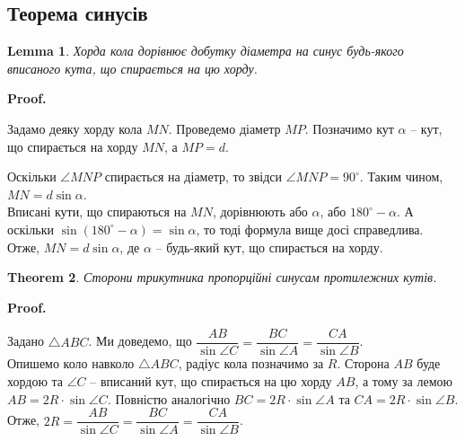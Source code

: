 \documentclass[a4paper, 10pt]{article}
\makeatletter
\theoremstyle{theoremdd}
\newtheorem{theorem}{Theorem}[subsection]
\theoremstyle{theoremdd}
\theoremstyle{theoremdd}
\theoremstyle{theoremdd}
\theoremstyle{theoremdd}
\theoremstyle{theoremdd}
\theoremstyle{theoremdd}
\theoremstyle{theoremdd}
\newtheorem{lemma}[theorem]{Lemma}
\theoremstyle{theoremdd}
\renewenvironment{proof}[1][Proof.\\]{\par
\pushQED{\hfill \qed}%
\normalfont \topsep6\p@\@plus6\p@\relax
\trivlist
\item\relax
{\bfseries
#1\@addpunct{.}}\hspace\labelsep\ignorespaces
}{%
\popQED\endtrivlist\@endpefalse
}
\makeatother
\begin{document}
\subsection{Теорема синусів}
\begin{lemma}
Хорда кола дорівнює добутку діаметра на синус будь-якого вписаного кута, що спирається на цю хорду.
\end{lemma}

\begin{proof}
Задамо деяку хорду кола $MN$. Проведемо діаметр $MP$. Позначимо кут $\alpha$ -- кут, що спирається на хорду $MN$, а $MP = d$.
\begin{figure}[H]
\centering
{}
\end{figure}
Оскільки $\angle MNP$ спирається на діаметр, то звідси $\angle MNP = 90^\circ$. Таким чином, $MN = d \sin \alpha$.\\
Вписані кути, що спираються на $MN$, дорівнюють або $\alpha$, або $180^\circ - \alpha$. А оскільки $\sin (180^\circ - \alpha) = \sin \alpha$, то тоді формула вище досі справедлива.\\
Отже, $MN = d \sin \alpha$, де $\alpha$ -- будь-який кут, що спирається на хорду.
\end{proof}

\begin{theorem}
Сторони трикутника пропорційні синусам протилежних кутів.
\end{theorem}

\begin{proof}
Задано $\triangle ABC$. Ми доведемо, що $\dfrac{AB}{\sin \angle C} = \dfrac{BC}{\sin \angle A} = \dfrac{CA}{\sin \angle B}$.\\
Опишемо коло навколо $\triangle ABC$, радіус кола позначимо за $R$. Сторона $AB$ буде хордою та $\angle C$ -- вписаний кут, що спирається на цю хорду $AB$, а тому за лемою $AB = 2R \cdot \sin \angle C$. Повністю аналогічно $BC = 2R \cdot \sin \angle A$ та $CA = 2R \cdot \sin \angle B$. Отже, $2R = \dfrac{AB}{\sin \angle C} = \dfrac{BC}{\sin \angle A} = \dfrac{CA}{\sin \angle B}$.
\end{proof}
\end{document}
